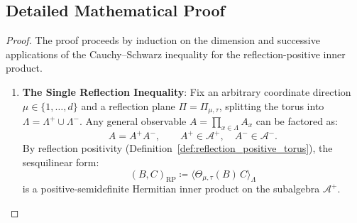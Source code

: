\subsection{Detailed Mathematical Proof}
\label{subsec:detailed_proof_chessboard}

\begin{proof}
The proof proceeds by induction on the dimension and successive applications of the Cauchy--Schwarz inequality for the reflection-positive inner product.

\begin{enumerate}[label=\textbf{Step \arabic*:}, leftmargin=*]
    \item \textbf{The Single Reflection Inequality}:
    Fix an arbitrary coordinate direction $\mu \in \{1, \dots, d\}$ and a reflection plane $\Pi = \Pi_{\mu, \tau}$, splitting the torus into $\Lambda = \Lambda^+ \cup \Lambda^-$.
    Any general observable $A = \prod_{x \in \Lambda} A_x$ can be factored as:
    \begin{equation}
    A = A^+ A^-, \qquad A^+ \in \mathcal{A}^+, \quad A^- \in \mathcal{A}^-.
    \end{equation}
    By reflection positivity (Definition~\ref{def:reflection_positive_torus}), the sesquilinear form:
    \begin{equation}
    (B, C)_{\mathrm{RP}} \coloneqq \langle \Theta_{\mu, \tau}(B) \, C \rangle_\Lambda
    \end{equation}
    is a positive-semidefinite Hermitian inner product on the subalgebra $\mathcal{A}^+$.
    

\end{enumerate}
\end{proof}
